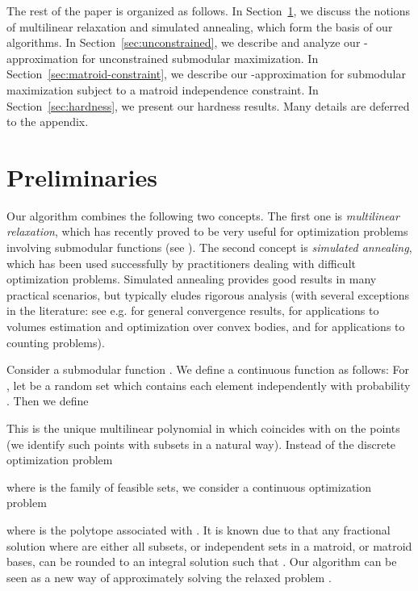 \documentclass{article}[11pt]
\begin{document}
The rest of the paper is organized as follows. In Section~\ref{sec:prelims},
we discuss the notions of multilinear relaxation and simulated annealing,
which form the basis of our algorithms. In Section~\ref{sec:unconstrained},
we describe and analyze our -approximation for unconstrained submodular
maximization. In Section~\ref{sec:matroid-constraint}, we describe
our -approximation for submodular maximization subject to a matroid
independence constraint. In Section~\ref{sec:hardness},
we present our hardness results.
Many details are deferred to the appendix.


\section{Preliminaries}
\label{sec:prelims}

Our algorithm combines the following two concepts. The first one is
{\em multilinear relaxation}, which has recently proved to be
very useful for optimization problems involving submodular functions
(see \cite{CCPV07,Vondrak08,CCPV09,KST09,LMNS09,Vondrak09}).
The second concept is {\em simulated annealing},
which has been used successfully by practitioners dealing with difficult optimization problems.
Simulated annealing provides good results in many practical scenarios, but typically
eludes rigorous analysis (with several exceptions in the literature:
see e.g. \cite{BT93} for general convergence results, 
\cite{LV03,KV06} for applications to volumes estimation and optimization over convex bodies,
and \cite{SVV07,BSVV08} for applications to counting problems).



\medskip
{}
Consider a submodular function . We define a continuous function
 as follows: For , let  be a random
set which contains each element  independently with probability . Then we define

This is the unique multilinear polynomial in  which coincides with 
on the points  (we identify such points with subsets  in a natural way).
Instead of the discrete optimization problem

where  is the family of feasible sets,
we consider a continuous optimization problem

where  is the polytope associated with .
It is known due to \cite{CCPV07,CCPV09,Vondrak09} that any fractional solution 
 where  are either all subsets, or independent sets in a matroid,
or matroid bases, can be rounded to an integral solution  such that
 . 
Our algorithm can be seen as a new way of approximately solving the relaxed
problem .
\end{document}
